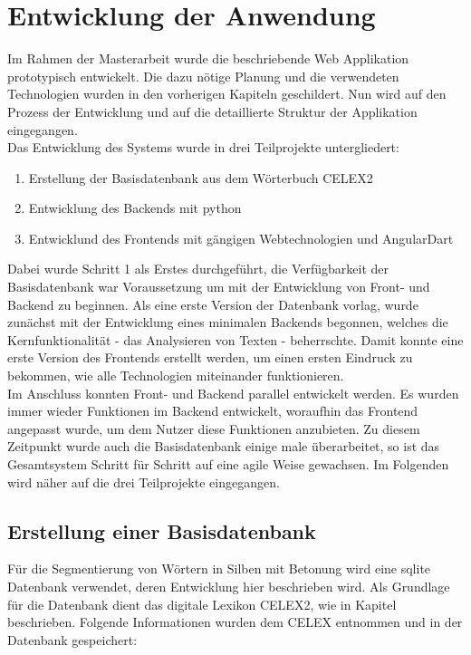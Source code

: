 
\chapter{Entwicklung der Anwendung}

Im Rahmen der Masterarbeit wurde die beschriebende Web Applikation prototypisch entwickelt. Die dazu nötige Planung und die verwendeten Technologien wurden in den vorherigen Kapiteln geschildert. Nun wird auf den Prozess der Entwicklung und auf die detaillierte Struktur der Applikation eingegangen.\\

Das Entwicklung des Systems wurde in drei Teilprojekte untergliedert:
\begin{enumerate}
	\item Erstellung der Basisdatenbank aus dem Wörterbuch CELEX2
	\item Entwicklung des Backends mit python
	\item Entwicklund des Frontends mit gängigen Webtechnologien und AngularDart
\end{enumerate}

Dabei wurde Schritt 1 als Erstes durchgeführt, die Verfügbarkeit der Basisdatenbank war Voraussetzung um mit der Entwicklung von Front- und Backend zu beginnen. Als eine erste Version der Datenbank vorlag, wurde zunächst mit der Entwicklung eines minimalen Backends begonnen, welches die Kernfunktionalität - das Analysieren von Texten - beherrschte. Damit konnte eine erste Version des Frontends erstellt werden, um einen ersten Eindruck zu bekommen, wie alle Technologien miteinander funktionieren.\\
Im Anschluss konnten Front- und Backend parallel entwickelt werden. Es wurden immer wieder Funktionen im Backend entwickelt, woraufhin das Frontend angepasst wurde, um dem Nutzer diese Funktionen anzubieten. Zu diesem Zeitpunkt wurde auch die Basisdatenbank einige male überarbeitet, so ist das Gesamtsystem Schritt für Schritt auf eine agile Weise  gewachsen. Im Folgenden wird näher auf die drei Teilprojekte eingegangen.

\section{Erstellung einer Basisdatenbank}

Für die Segmentierung von Wörtern in Silben mit Betonung wird eine sqlite Datenbank verwendet, deren Entwicklung hier beschrieben wird. Als Grundlage für die Datenbank dient das digitale Lexikon  CELEX2, wie in Kapitel  beschrieben. Folgende Informationen wurden dem CELEX entnommen und in der Datenbank gespeichert:

